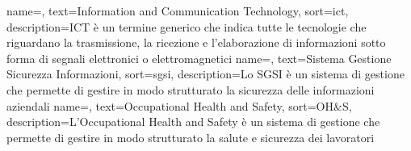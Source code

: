  {
    name=,
    text=Information and Communication Technology,
    sort=ict,
    description={ICT è un termine generico che indica tutte le tecnologie che riguardano la trasmissione, la ricezione e l'elaborazione di informazioni sotto forma di segnali elettronici o elettromagnetici}
}
 {
    name=,
    text=Sistema Gestione Sicurezza Informazioni,
    sort=sgsi,
    description={Lo SGSI è un sistema di gestione che permette di gestire in modo strutturato la sicurezza delle informazioni aziendali}
}
 {
    name=,
    text=Occupational Health and Safety,
    sort=OH\&S,
    description={L'Occupational Health and Safety è un sistema di gestione che permette di gestire in modo strutturato la salute e sicurezza dei lavoratori}
}
